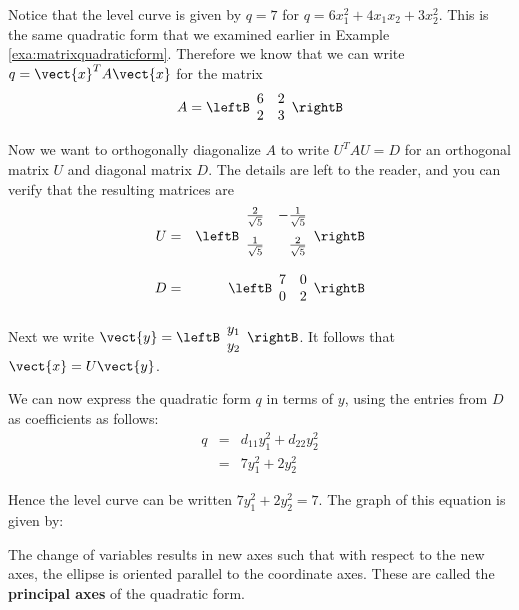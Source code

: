 \begin{solution}
Notice that the level curve is given by $q = 7$ for $q = 6x_1^2 + 4x_1x_2 + 3x_2^2$. This is the same quadratic form that we examined earlier in Example \ref{exa:matrixquadraticform}. Therefore we know that we can write $q = \vect{x}^T A \vect{x}$ for the matrix 
\[
A = \leftB
\begin{array}{rr}
6 & 2 \\
2 & 3
\end{array}
\rightB
\]

Now we want to orthogonally diagonalize $A$ to write $U^TAU=D$ for an orthogonal matrix $U$ and diagonal matrix $D$. The details are left to the reader, and you can verify that the resulting matrices are 
\begin{eqnarray*}
U &=& 
\leftB
\begin{array}{rr}
\vspace{0.05in}\frac{2}{\sqrt{5}} & -\vspace{0.05in}\frac{1}{\sqrt{5}} \\
\vspace{0.05in}\frac{1}{\sqrt{5}} & \vspace{0.05in}\frac{2}{\sqrt{5}}
\end{array}
\rightB \\
D &=& 
\leftB
\begin{array}{rr}
 7 & 0 \\
0 & 2 
\end{array}
\rightB
\end{eqnarray*}

Next we write $ \vect{y} = \leftB 
\begin{array}{c}
y_1 \\
y_2 
\end{array}
\rightB$. It follows that $\vect{x} = U \vect{y}$. 

We can now express the quadratic form $q$ in terms of $y$, using the entries from $D$ as coefficients as follows:
\begin{eqnarray*}
q &=& d_{11}y_1^2 + d_{22}y_2^2 \\
&=& 7y_1^2 + 2y_2^2 
\end{eqnarray*}

Hence the level curve can be written $7y_1^2 + 2y_2^2 =7$. 
The graph of this equation is given by:

\begin{center}
\end{center}

The change of variables results in new axes such that with respect to the new axes, the ellipse is oriented parallel to the coordinate axes. These are called the \textbf{principal axes} of the quadratic form. 
\end{solution}

